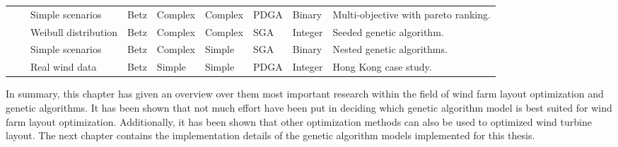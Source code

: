 \begin{sidewaystable}
\begin{center}
\begin{tabular}{l | l | l | l | l | l | l | l | l }
\cite{Sisbot}                  & \cite{Jensen}    & Simple scenarios      & Betz \citep{Albring}                & Complex     & Complex    & PDGA   & Binary   & Multi-objective with pareto ranking. \\
\cite{Saavedra-Morena} & \cite{Jensen}    & Weibull distribution  & Betz \citep{Albring}                & Complex     & Complex   & SGA    & Integer  & Seeded genetic algorithm. \\
\cite{Chen}                    & \cite{Frandsen} & Simple scenarios      & Betz \citep{Albring}                & Complex     & Simple       & SGA    & Binary   & Nested genetic algorithms. \\
\cite{Gao}                      & \cite{Jensen}    & Real wind data         & Betz \citep{Albring}                & Simple        & Simple       & PDGA   & Integer  & Hong Kong case study.
\end{tabular} 
\end{center}
\end{sidewaystable}


\noindent In summary, this chapter has given an overview over them most important research within the field of wind farm layout optimization and genetic algorithms. It has been shown that not much effort have been put in deciding which genetic algorithm model is best suited for wind farm layout optimization. Additionally, it has been shown that other optimization methods can also be used to optimized wind turbine layout. The next chapter contains the implementation details of the genetic algorithm models implemented for this thesis. 

